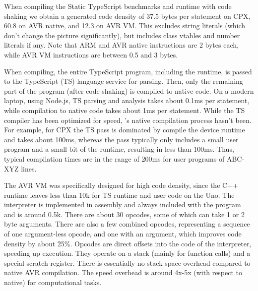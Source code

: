 
When compiling the Static TypeScript benchmarks and runtime with code shaking we obtain
a generated code density of 37.5 bytes per statement on CPX, 60.8 on AVR native, and 12.3 on AVR VM.
This excludes string literals (which don't change the picture significantly), but includes class
vtables and number literals if any. Note that ARM and AVR native instructions are 2 bytes each,
while AVR VM instructions are between 0.5 and 3 bytes.

When compiling, the entire TypeScript program, including the runtime, is
passed to the TypeScript (TS) language service for parsing. Then, only the remaining
part of the program (after code shaking) is compiled to native code.
On a modern laptop, using Node.js, TS parsing and analysis takes about 0.1ms per statement,
while \MC compilation to native code takes about 1ms per statement.
While the TS compiler has been optimized for speed,
\MCN's native compilation process hasn't been.
For example, for CPX the TS pass is dominated by compile the device runtime
and takes about 100ms, whereas the \MC pass typically only includes a small user program
and a small bit of the runtime, resulting in less than 100ms.
Thus, typical compilation times are in the range of 200ms for user programs
of ABC-XYZ lines.

The AVR VM was specifically designed for high code density, since the C++ runtime
leaves less than 10k for TS runtime and user code on the Uno.
The interpreter is implemented in assembly and always included with the program and is around 0.5k.
There are about 30 opcodes, some of which can take 1 or 2 byte arguments.
There are also a few combined opcodes, representing a sequence of one argument-less opcode,
and one with an argument, which improves code density by about 25\%.
Opcodes are direct offsets into the code of the interpreter, speeding up execution.
They operate on a stack (mainly for function calls) and a special scratch register.
There is essentially no stack space overhead compared to native AVR compilation.
The speed overhead is around 4x-5x (with respect to native) for computational tasks.



